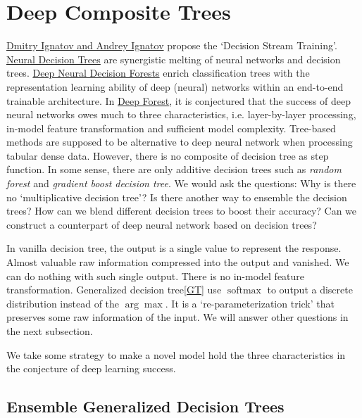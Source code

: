 \documentclass[UTF8]{article}
\begin{document}
\iffalse
\section{Deep Composite Trees}

\href{https://arxiv.org/pdf/1704.07657.pdf}{Dmitry Ignatov and Andrey Ignatov}
propose the  `Decision Stream Training'.
\href{https://arxiv.org/abs/1702.07360}{Neural Decision Trees} are
synergistic melting of neural networks and decision trees.
\href{https://www.ijcai.org/Proceedings/16/Papers/628.pdf}{Deep Neural Decision Forests}
enrich classification trees with the representation learning ability of
deep (neural) networks within an end-to-end trainable architecture.
In \href{https://academic.oup.com/nsr/article/6/1/74/5123737}{Deep Forest},
it is conjectured that the success of deep neural networks owes much to three characteristics,
i.e. layer-by-layer processing, in-model feature transformation and sufficient model complexity.
Tree-based methods are supposed to be alternative to deep neural network
when processing tabular dense data.
However, there is no composite of decision tree as step function.
In some sense, there are only additive decision trees
such as \emph{random forest} and \emph{gradient boost decision tree}.
We would ask the questions:
Why is there  no `multiplicative decision tree'?
Is there  another way to ensemble the decision trees?
How can we blend different decision trees to boost their accuracy?
Can we construct a counterpart of deep neural network based on decision trees?

In vanilla decision tree, the output is a single value to represent the response.
Almost valuable raw information compressed into the output and vanished.
We can do nothing with such single output.
There is no in-model feature transformation.
Generalized decision tree\eqref{GT} use $\operatorname{softmax}$
to output a discrete distribution instead of the $\arg\max$.
It is a `re-parameterization trick'
that preserves some raw information of the input.
We will answer other questions in the next subsection.

We take some strategy to make a novel model hold the three characteristics
in the conjecture of deep learning success.

\subsection{Ensemble Generalized Decision Trees}
\end{document}

